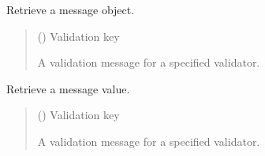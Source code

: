 \documentclass[letterpaper,10pt,english]{sphinxmanual}
\begin{document}
\begin{fulllineitems}
\begin{fulllineitems}
\label{\detokenize{apache_commons_validator_python:apache_commons_validator_python.field_new.Field.get_message}}
\pysigstartsignatures
{}
\pysigstopsignatures
\sphinxAtStartPar
Retrieve a message object.
\begin{quote}\begin{description}
\sphinxAtStartPar
{} () \textendash{} Validation key

\sphinxAtStartPar
A validation message for a specified validator.

\end{description}\end{quote}

\end{fulllineitems}


\begin{fulllineitems}
\label{\detokenize{apache_commons_validator_python:apache_commons_validator_python.field_new.Field.get_msg}}
\pysigstartsignatures
{}
\pysigstopsignatures
\sphinxAtStartPar
Retrieve a message value.
\begin{quote}\begin{description}
\sphinxAtStartPar
{} () \textendash{} Validation key

\sphinxAtStartPar
A validation message for a specified validator.

\end{description}\end{quote}


\end{fulllineitems}
\end{fulllineitems}
\end{document}
